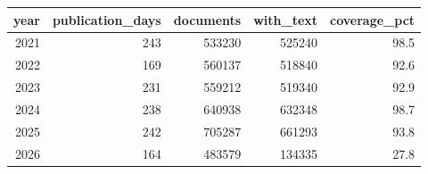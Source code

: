 \begin{table}[htbp]
\centering
\label{tab:corpus_coverage}
\begin{tabular}{rrrrr}
\toprule
year & publication\_days & documents & with\_text & coverage\_pct \\
\midrule
2021 & 243 & 533230 & 525240 & 98.5 \\
2022 & 169 & 560137 & 518840 & 92.6 \\
2023 & 231 & 559212 & 519340 & 92.9 \\
2024 & 238 & 640938 & 632348 & 98.7 \\
2025 & 242 & 705287 & 661293 & 93.8 \\
2026 & 164 & 483579 & 134335 & 27.8 \\
\bottomrule
\end{tabular}
\end{table}
